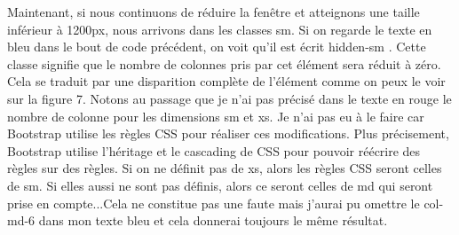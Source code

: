 \documentclass{article}
\begin{document}
Maintenant, si nous continuons de r\'eduire la fen\^etre et atteignons une taille inf\'erieur \`a 1200px, nous arrivons dans les classes sm. Si on regarde le texte en bleu dans le bout de code pr\'ec\'edent, on voit qu'il est \'ecrit \og hidden-sm \fg{}. Cette classe signifie que le nombre de colonnes pris par cet \'el\'ement sera r\'eduit \`a z\'ero. Cela se traduit par une disparition compl\`ete de l'\'el\'ement comme on peux le voir sur la figure 7. Notons au passage que je n'ai pas pr\'ecis\'e dans le texte en rouge le nombre de colonne pour les dimensions sm et xs. Je n'ai pas eu \`a le faire car Bootstrap utilise les r\`egles CSS pour r\'ealiser ces modifications. Plus pr\'ecisement, Bootstrap utilise l'h\'eritage et le cascading de CSS pour pouvoir r\'e\'ecrire des r\`egles sur des r\`egles. Si on ne d\'efinit pas de xs, alors les r\`egles CSS seront celles de sm. Si elles aussi ne sont pas d\'efinis, alors ce seront celles de md qui seront prise en compte...Cela ne constitue pas une faute mais j'aurai pu omettre le \og col-md-6 \fg{} dans mon texte bleu et cela donnerai toujours le m\^eme r\'esultat.\\
\end{document}
